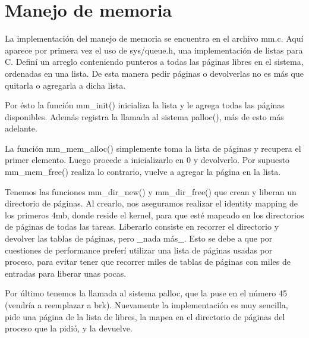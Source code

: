 \section{Manejo de memoria}

La implementación del manejo de memoria se encuentra en el archivo mm.c. Aquí
aparece por primera vez el uso de sys/queue.h, una implementación de listas
para C. Definí un arreglo conteniendo punteros a todas las páginas libres en el
sistema, ordenadas en una lista. De esta manera pedir páginas o devolverlas no
es más que quitarla o agregarla a dicha lista.

Por ésto la función mm\_init() inicializa la lista y le agrega todas las
páginas disponibles. Además registra la llamada al sistema palloc(), más de
esto más adelante.

La función mm\_mem\_alloc() simplemente toma la lista de páginas y recupera
el primer elemento. Luego procede a inicializarlo en 0 y devolverlo. Por
supuesto mm\_mem\_free() realiza lo contrario, vuelve a agregar la página en la
lista.

Tenemos las funciones mm\_dir\_new() y mm\_dir\_free() que crean y liberan
un directorio de páginas. Al crearlo, nos aseguramos realizar el identity
mapping de los primeros 4mb, donde reside el kernel, para que esté mapeado en
los directorios de páginas de todas las tareas. Liberarlo consiste en recorrer
el directorio y devolver las tablas de páginas, pero \_nada más\_. Esto se debe
a que por cuestiones de performance preferí utilizar una lista de páginas
usadas por proceso, para evitar tener que recorrer miles de tablas de páginas
con miles de entradas para liberar unas pocas.

Por último tenemos la llamada al sistema palloc, que la puse en el número 45
(vendría a reemplazar a brk). Nuevamente la implementación es muy sencilla,
pide una página de la lista de libres, la mapea en el directorio de páginas del
proceso que la pidió, y la devuelve.
